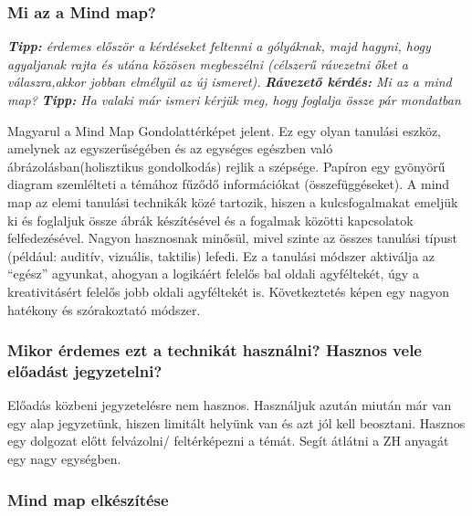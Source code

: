 \documentclass[../Main.tex]{subfiles}
\begin{document}
\subsubsection{Mi az a Mind map?}

\textit{\textbf{Tipp:} érdemes először a kérdéseket feltenni a gólyáknak, majd hagyni,
 hogy agyaljanak rajta és utána közösen megbeszélni 
(célszerű rávezetni őket a válaszra,akkor jobban elmélyül az új ismeret).} \newline
 \textit{\textbf{Rávezető kérdés:} Mi az a mind map?} \newline
\textit{\textbf{Tipp:} Ha valaki már ismeri kérjük meg, hogy foglalja össze pár mondatban}

\begin{flushleft}
    Magyarul a Mind Map Gondolattérképet jelent. Ez egy olyan tanulási eszköz, amelynek az egyszerűségében és
    az egységes egészben való ábrázolásban(holisztikus gondolkodás) rejlik a szépsége. Papíron egy gyönyörű
    diagram szemlélteti a témához fűződő információkat (összefüggéseket).
    A mind map az elemi tanulási technikák közé tartozik, hiszen a kulcsfogalmakat emeljük ki
    és foglaljuk össze ábrák készítésével és a fogalmak közötti kapcsolatok felfedezésével.
    Nagyon hasznosnak minősül, mivel szinte az összes tanulási típust (például: auditív, vizuális, taktilis) lefedi.
    Ez a tanulási módszer aktiválja az “egész” agyunkat, ahogyan a logikáért felelős bal oldali agyféltekét,
    úgy a kreativitásért felelős jobb oldali agyféltekét is. Következtetés képen egy nagyon hatékony és szórakoztató módszer.
\end{flushleft}

\subsubsection{Mikor érdemes ezt a technikát használni? \newline Hasznos vele előadást jegyzetelni?}

\begin{flushleft}
    Előadás közbeni jegyzetelésre nem hasznos.
    Használjuk azután miután már van egy alap jegyzetünk, hiszen limitált helyünk van és azt jól kell beosztani.
     Hasznos egy dolgozat előtt felvázolni/ feltérképezni a témát. Segít átlátni a ZH anyagát egy nagy egységben.
\end{flushleft}

\subsubsection{Mind map elkészítése}
\end{document}
